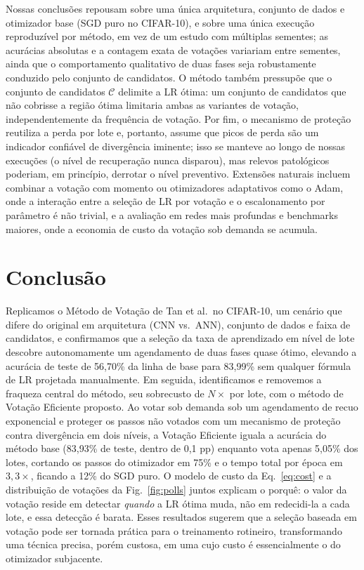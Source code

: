 \documentclass[conference]{IEEEtran}
\begin{document}
Nossas conclusões repousam sobre uma única arquitetura, conjunto de dados e otimizador base (SGD puro no CIFAR-10), e sobre uma única execução reproduzível por método, em vez de um estudo com múltiplas sementes; as acurácias absolutas e a contagem exata de votações variariam entre sementes, ainda que o comportamento qualitativo de duas fases seja robustamente conduzido pelo conjunto de candidatos. O método também pressupõe que o conjunto de candidatos $\mathcal{C}$ delimite a LR ótima: um conjunto de candidatos que não cobrisse a região ótima limitaria ambas as variantes de votação, independentemente da frequência de votação. Por fim, o mecanismo de proteção reutiliza a perda por lote e, portanto, assume que picos de perda são um indicador confiável de divergência iminente; isso se manteve ao longo de nossas execuções (o nível de recuperação nunca disparou), mas relevos patológicos poderiam, em princípio, derrotar o nível preventivo. Extensões naturais incluem combinar a votação com momento ou otimizadores adaptativos como o Adam, onde a interação entre a seleção de LR por votação e o escalonamento por parâmetro é não trivial, e a avaliação em redes mais profundas e benchmarks maiores, onde a economia de custo da votação sob demanda se acumula.

\section{Conclusão}

Replicamos o Método de Votação de Tan et al.\ no CIFAR-10, um cenário que difere do original em arquitetura (CNN vs.\ ANN), conjunto de dados e faixa de candidatos, e confirmamos que a seleção da taxa de aprendizado em nível de lote descobre autonomamente um agendamento de duas fases quase ótimo, elevando a acurácia de teste de 56,70\% da linha de base para 83,99\% sem qualquer fórmula de LR projetada manualmente. Em seguida, identificamos e removemos a fraqueza central do método, seu sobrecusto de $N\times$ por lote, com o método de Votação Eficiente proposto. Ao votar sob demanda sob um agendamento de recuo exponencial e proteger os passos não votados com um mecanismo de proteção contra divergência em dois níveis, a Votação Eficiente iguala a acurácia do método base (83,93\% de teste, dentro de 0,1 pp) enquanto vota apenas 5,05\% dos lotes, cortando os passos do otimizador em 75\% e o tempo total por época em $3,3\times$, ficando a 12\% do SGD puro. O modelo de custo da Eq.~\eqref{eq:cost} e a distribuição de votações da Fig.~\ref{fig:polls} juntos explicam o porquê: o valor da votação reside em detectar \emph{quando} a LR ótima muda, não em redecidi-la a cada lote, e essa detecção é barata. Esses resultados sugerem que a seleção baseada em votação pode ser tornada prática para o treinamento rotineiro, transformando uma técnica precisa, porém custosa, em uma cujo custo é essencialmente o do otimizador subjacente.
\end{document}
